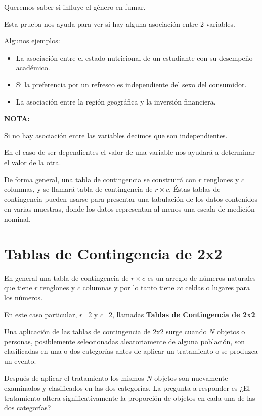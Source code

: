 \documentclass[a4paper,oneside,openany]{book}
\begin{document}
Queremos saber si influye el género en fumar.

Esta prueba nos ayuda para ver si hay alguna asociación entre 2
variables.

Algunos ejemplos:

\begin{itemize}
\item
  La asociación entre el estado nutricional de un estudiante con su
  desempeño académico.
\item
  Si la preferencia por un refresco es independiente del sexo del
  consumidor.
\item
  La asociación entre la región geográfica y la inversión financiera.
\end{itemize}

\textbf{NOTA:}

Si no hay asociación entre las variables decimos que son independientes.

En el caso de ser dependientes el valor de una variable nos ayudará a
determinar el valor de la otra.

De forma general, una tabla de contingencia se construirá con \(r\)
renglones y \(c\) columnas, y se llamará tabla de contingencia de
\(r\times c\). Éstas tablas de contingencia pueden usarse para presentar
una tabulación de los datos contenidos en varias muestras, donde los
datos representan al menos una escala de medición nominal.

\chapter{Tablas de Contingencia de
2x2}\label{tablas-de-contingencia-de-2x2}

En general una tabla de contingencia de \(r \times c\) es un arreglo de
números naturales que tiene \(r\) renglones y \(c\) columnas y por lo
tanto tiene \(rc\) celdas o lugares para los números.

En este caso particular, \(r\)=2 y \(c\)=2, llamadas \textbf{Tablas de
Contingencia de 2x2}.

Una aplicación de las tablas de contingencia de 2x2 surge cuando \(N\)
objetos o personas, posiblemente seleccionadas aleatoriamente de alguna
población, son clasificadas en una o dos categorías antes de aplicar un
tratamiento o se produzca un evento.

Después de aplicar el tratamiento los mismos \(N\) objetos son
nuevamente examinados y clasificados en las dos categorías. La pregunta
a responder es ¿El tratamiento altera significativamente la proporción
de objetos en cada una de las dos categorías?
\end{document}
